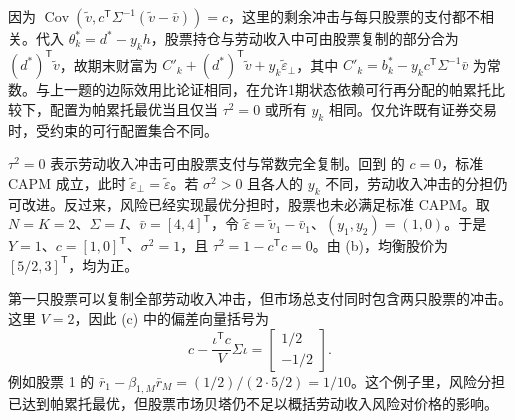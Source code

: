 \begin{solution}[blank-type=manual,blank-vsep=9\baselineskip]
\begin{enumerate}[label=(\alph*)]
因为 $\operatorname{Cov}(\widetilde v,c^{\mathsf T}\Sigma^{-1}(\widetilde v-\bar v))=c$，这里的剩余冲击与每只股票的支付都不相关。代入 $\theta_k^*=d^*-y_kh$，股票持仓与劳动收入中可由股票复制的部分合为 $(d^*)^{\mathsf T}\widetilde v$，故期末财富为 $C'_k+(d^*)^{\mathsf T}\widetilde v+y_k\widetilde\varepsilon_\perp$，其中 $C'_k=b_k^*-y_kc^{\mathsf T}\Sigma^{-1}\bar v$ 为常数。与上一题的边际效用比论证相同，在允许1期状态依赖可行再分配的帕累托比较下，配置为帕累托最优当且仅当 $\tau^2=0$ 或所有 $y_k$ 相同。仅允许既有证券交易时，受约束的可行配置集合不同。

$\tau^2=0$ 表示劳动收入冲击可由股票支付与常数完全复制。回到 的 $c=0$，标准 CAPM 成立，此时 $\widetilde\varepsilon_\perp=\widetilde\varepsilon$。若 $\sigma^2>0$ 且各人的 $y_k$ 不同，劳动收入冲击的分担仍可改进。反过来，风险已经实现最优分担时，股票也未必满足标准 CAPM。取 $N=K=2$、$\Sigma=I$、$\bar v=[4,4]^{\mathsf T}$，令 $\widetilde\varepsilon=\widetilde v_1-\bar v_1$、$(y_1,y_2)=(1,0)$。于是 $Y=1$、$c=[1,0]^{\mathsf T}$、$\sigma^2=1$，且 $\tau^2=1-c^{\mathsf T}c=0$。由 (b)，均衡股价为 $[5/2,3]^{\mathsf T}$，均为正。

第一只股票可以复制全部劳动收入冲击，但市场总支付同时包含两只股票的冲击。这里 $V=2$，因此 (c) 中的偏差向量括号为
\[
 c-\frac{\iota^{\mathsf T}c}{V}\Sigma\iota
 =\begin{bmatrix}1/2\\-1/2\end{bmatrix}.
\]
例如股票 1 的 $\bar r_1-\beta_{1,M}\bar r_M=(1/2)/(2\cdot 5/2)=1/10$。这个例子里，风险分担已达到帕累托最优，但股票市场贝塔仍不足以概括劳动收入风险对价格的影响。\qedhere
\end{enumerate}
\end{solution}

